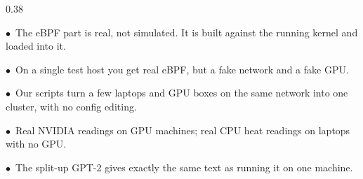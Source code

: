 \documentclass[aspectratio=169,11pt]{beamer}
\begin{document}
\begin{frame}[shrink=20]
\begin{columns}[T]
\begin{column}{0.38\textwidth}
{\begin{minipage}{\dimexpr\textwidth-14pt\relax}
      {\scriptsize\color{white!62!keink}
       \textcolor{keteal}{$\bullet$}\ The eBPF part is real, not simulated.
       It is built against the running kernel and loaded into
       it.\par\vspace{0.45em}
       \textcolor{keteal}{$\bullet$}\ On a single test host you get real eBPF,
       but a fake network and a fake GPU.\par\vspace{0.45em}
       \textcolor{keteal}{$\bullet$}\ Our scripts turn a few laptops and GPU
       boxes on the same network into one cluster, with no config
       editing.\par\vspace{0.45em}
       \textcolor{keteal}{$\bullet$}\ Real NVIDIA readings on GPU machines; real
       CPU heat readings on laptops with no GPU.\par\vspace{0.45em}
       \textcolor{keteal}{$\bullet$}\ The split-up GPT-2 gives exactly the same
       text as running it on one machine.}
      \vspace{0.5em}
    \end{minipage}}
  \end{column}
  \end{columns}
\end{frame}
\end{document}
